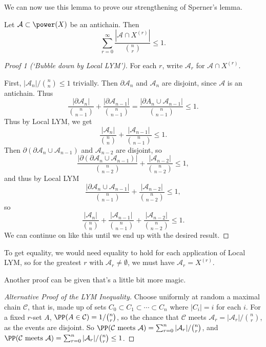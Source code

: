 \documentclass[a4paper]{scrartcl}
\newcommand{\A}{\mathcal{A}}
\begin{document}
We can now use this lemma to prove our strengthening of Sperner's lemma.

\begin{theorem}
    Let $\A \subset \power(X)$ be an antichain. Then
    $$
\sum_{r = 0}^{\infty} \frac{|\A \cap X^{(r)}|}{\binom{n}{r}} \leq 1.
    $$
\end{theorem}
\begin{proof}[Proof 1 (`Bubble down by Local LYM')]
    For each $r$, write $\A_r$ for $\A \cap X^{(r)}$.
    
    First, $|\A_n| / \binom{n}{n} \leq 1$ trivially. Then $\partial \A_n$ and $\A_n$ are disjoint, since $\A$ is an antichain. Thus
    $$
    \frac{|\partial \A_n|}{\binom{n}{n - 1}} + \frac{|\partial \A_{n - 1}|}{\binom{n}{n - 1}} = \frac{|\partial A_n \cup \A_{n - 1}|}{\binom{n}{n - 1}} \leq 1.
    $$
    Thus by Local LYM, we get
    $$
    \frac{|\A_n|}{\binom{n}{n}} + \frac{|\A_{n - 1}|}{\binom{n}{n - 1}} \leq 1.
    $$
    Then $\partial(\partial \A_n \cup \A_{n - 1})$ and $\A_{n - 2}$ are disjoint, so
    $$
\frac{|\partial(\partial \A_n \cup \A_{n - 1})|}{\binom{n}{n - 2}} + \frac{|\A_{n - 2}|}{\binom{n}{n - 2}} \leq 1,
    $$
    and thus by Local LYM
    $$
    \frac{|\partial \A_n \cup \A_{n - 1}|}{\binom{n}{n - 1}} + \frac{|\A_{n - 2}|}{\binom{n}{n - 2}} \leq 1,
    $$
    so
    $$
    \frac{|\A_n|}{\binom{n}{n}} + \frac{|\A_{n - 1}|}{\binom{n}{n - 1}} + \frac{|\A_{n - 2}|}{\binom{n}{n - 2}}  \leq 1.
    $$
    We can continue on like this until we end up with the desired result.
\end{proof}
To get equality, we would need equality to hold for each application of Local LYM, so for the greatest $r$ with $\A_r \neq \emptyset$, we must have $\A_r = X^{(r)}$.

Another proof can be given that's a little bit more magic.

\begin{proof}[Alternative Proof of the LYM Inequality]
    Choose uniformly at random a maximal chain $\mathcal{C}$, that is, made up of sets $C_0 \subset C_1 \subset \cdots \subset C_n$ where $|C_i| = i$ for each $i$.
    For a fixed $r$-set $A$, $\PP(A \in \mathcal{C}) = 1/\binom{n}{r}$, so the chance that $\mathcal{C}$ meets $\mathcal{A}_r = |\mathcal{A}_r|/\binom{n}{r}$, as the events are disjoint. So $\PP(\mathcal{C} \text{ meets } \A) = \sum_{r = 0}^n |\A_r|/\binom{n}{r}$, and $\PP(\mathcal{C} \text{ meets } \A) = \sum_{r = 0}^n |\A_r| / \binom{n}{r} \leq 1$.
\end{proof}
\end{document}
